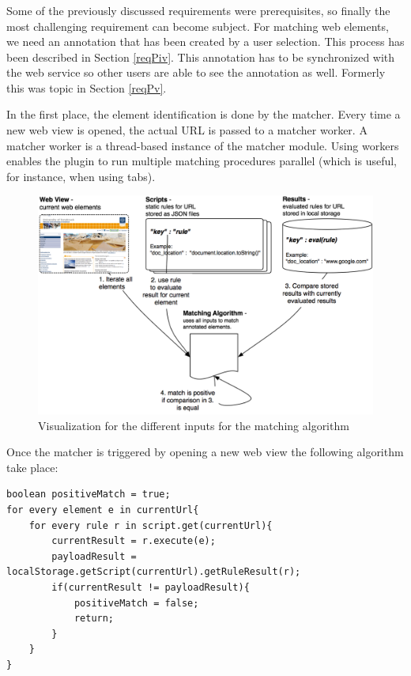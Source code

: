 \subsubsection[Web Element Identification]{\reqPvii}
Some of the previously discussed requirements were prerequisites, so finally the most challenging requirement can become subject. 
For matching web elements, we need an annotation that has been created by a user selection. This process has been described in Section \ref{reqPiv}. This annotation has to be synchronized with the web service so other users are able to see the annotation as well. Formerly this was topic in Section \ref{reqPv}. 

In the first place, the element identification is done by the matcher. Every time a new web view is opened, the actual URL is passed to a matcher worker. A matcher worker is a thread-based instance of the matcher module. Using workers enables the plugin to run multiple matching procedures parallel (which is useful, for instance, when using tabs). 

\begin{figure}\centering
	\includegraphics[width=13cm]{images/matching-algorithm.png}
\caption{Visualization for the different inputs for the matching algorithm}
\label{matching-algorithm}
\end{figure}

Once the matcher is triggered by opening a new web view the following algorithm take place:
\begin{lstlisting}
boolean positiveMatch = true;
for every element e in currentUrl{
	for every rule r in script.get(currentUrl){
		currentResult = r.execute(e);
		payloadResult = localStorage.getScript(currentUrl).getRuleResult(r);
		if(currentResult != payloadResult){
			positiveMatch = false;
			return;
		}
	}
}
\end{lstlisting}

